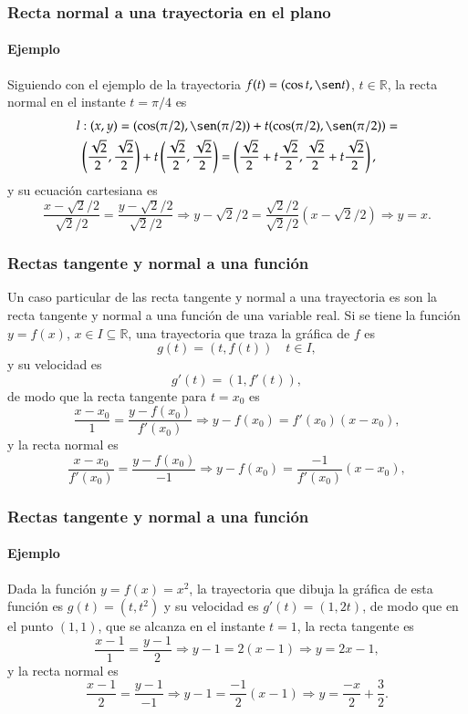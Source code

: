 \begin{frame}
\frametitle{Recta normal a una trayectoria en el plano}
\framesubtitle{Ejemplo}
Siguiendo con el ejemplo de la trayectoria $f(t) = (\cos t,\sen t)$, $t\in \mathbb{R}$, la recta normal en el instante $t=\pi/4$ es
\begin{align*}
l&: (x,y)=(\cos(\pi/2),\sen(\pi/2))+t(\cos(\pi/2),\sen(\pi/2)) =\\
& \left(\frac{\sqrt{2}}{2},\frac{\sqrt{2}}{2}\right)+t\left(\frac{\sqrt{2}}{2},\frac{\sqrt{2}}{2}\right)
=\left(\frac{\sqrt{2}}{2}+t\frac{\sqrt{2}}{2},\frac{\sqrt{2}}{2}+t\frac{\sqrt{2}}{2}\right),
\end{align*}
y su ecuación cartesiana es
\[
\frac{x-\sqrt{2}/2}{\sqrt{2}/2} = \frac{y-\sqrt{2}/2}{\sqrt{2}/2}\Rightarrow y-\sqrt{2}/2 = \frac{\sqrt{2}/2}{\sqrt{2}/2}(x-\sqrt{2}/2) \Rightarrow y=x.
\]
\begin{center}
\scalebox{0.8}{}
\end{center}  
\end{frame}


\begin{frame}
\frametitle{Rectas tangente y normal a una función}
Un caso particular de las recta tangente y normal a una trayectoria es son la recta tangente y normal a una función de una variable real. 
Si se tiene la función $y=f(x)$, $x\in I\subseteq \mathbb{R}$, una trayectoria que traza la gráfica de $f$ es 
\[
g(t) = (t,f(t))  \quad t\in I,
\]
y su velocidad es
\[
g'(t) = (1,f'(t)),
\]
de modo que la recta tangente para $t=x_0$ es
\[
\frac{x-x_0}{1} = \frac{y-f(x_0)}{f'(x_0)} \Rightarrow y-f(x_0) = f'(x_0)(x-x_0),
\]  
y la recta normal es 
\[
\frac{x-x_0}{f'(x_0)} = \frac{y-f(x_0)}{-1} \Rightarrow y-f(x_0) = \frac{-1}{f'(x_0)}(x-x_0),
\]
\end{frame}


\begin{frame}
\frametitle{Rectas tangente y normal a una función}
\framesubtitle{Ejemplo}
Dada la función $y=f(x)=x^2$, la trayectoria que dibuja la gráfica de esta función es $g(t)=(t,t^2)$ y su velocidad es
$g'(t)=(1,2t)$, de modo que en el punto $(1,1)$, que se alcanza en el instante $t=1$, la recta tangente es
\[
\frac{x-1}{1} = \frac{y-1}{2} \Rightarrow y-1 = 2(x-1) \Rightarrow y = 2x-1,
\]  
y la recta normal es 
\[
\frac{x-1}{2} = \frac{y-1}{-1} \Rightarrow y-1 = \frac{-1}{2}(x-1) \Rightarrow y = \frac{-x}{2}+\frac{3}{2}.
\]
\begin{center}
\scalebox{0.8}{}
\end{center} 
\end{frame}



